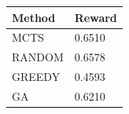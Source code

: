 \begin{tabular}{ll}
\hline
Method & Reward \\
\hline
  MCTS & 0.6510 \\
  RANDOM & 0.6578 \\
  GREEDY & 0.4593 \\
  GA & 0.6210 \\
\hline
\end{tabular}

